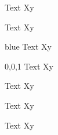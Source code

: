 \documentclass{article}
\begin{document}
\begingroup

\begin{adjustbox}{bgcolor=blue}
    Text Xy
\end{adjustbox}

\begin{adjustbox}{bgcolor*=\color{blue}}
    Text Xy
\end{adjustbox}




\begin{bgcolorbox}{blue}
    Text Xy
\end{bgcolorbox}

\begin{bgcolorbox}[rgb]{0,0,1}
    Text Xy
\end{bgcolorbox}

\begin{bgcolorbox*}{\color{blue}}
    Text Xy
\end{bgcolorbox*}

\begin{adjustbox}{fgcolor=blue}
    Text Xy
\end{adjustbox}

\begin{adjustbox}{fgcolor*=\color{blue}}
    Text Xy
\end{adjustbox}

\clearpage
\end{document}
